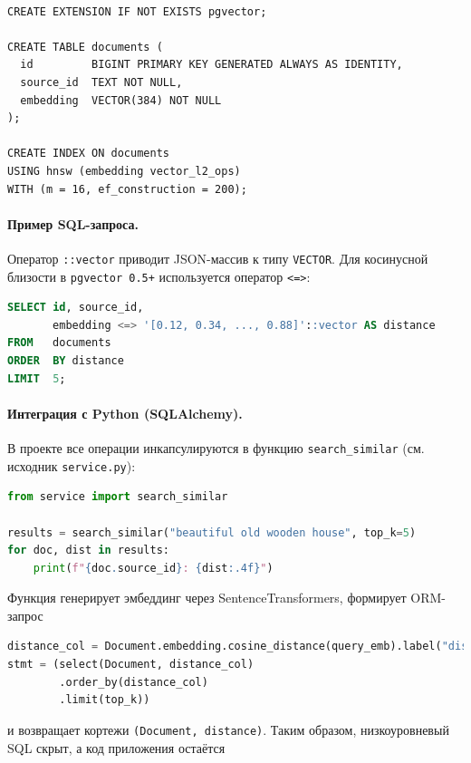 \begin{lstlisting}
      
CREATE EXTENSION IF NOT EXISTS pgvector;

CREATE TABLE documents (
  id         BIGINT PRIMARY KEY GENERATED ALWAYS AS IDENTITY,
  source_id  TEXT NOT NULL,
  embedding  VECTOR(384) NOT NULL
);

CREATE INDEX ON documents
USING hnsw (embedding vector_l2_ops)
WITH (m = 16, ef_construction = 200);
\end{lstlisting}


\paragraph{Пример SQL-запроса.}
Оператор \verb|::vector| приводит JSON-массив к типу \texttt{VECTOR}\@.
Для косинусной близости в \texttt{pgvector 0.5+}
используется оператор \verb|<=>|:

\begin{lstlisting}[language=SQL]
SELECT id, source_id,
       embedding <=> '[0.12, 0.34, ..., 0.88]'::vector AS distance
FROM   documents
ORDER  BY distance                               
LIMIT  5;
\end{lstlisting}

\paragraph{Интеграция с Python (SQLAlchemy).}
В проекте все операции инкапсулируются в функцию
\verb|search_similar| (см. исходник \verb|service.py|):

\begin{lstlisting}[language=Python,encoding=cp1251]
from service import search_similar

results = search_similar("beautiful old wooden house", top_k=5)
for doc, dist in results:
    print(f"{doc.source_id}: {dist:.4f}")
\end{lstlisting}

Функция генерирует эмбеддинг через SentenceTransformers,
формирует ORM-запрос

\begin{lstlisting}[language=Python]
distance_col = Document.embedding.cosine_distance(query_emb).label("distance")
stmt = (select(Document, distance_col)
        .order_by(distance_col)
        .limit(top_k))
\end{lstlisting}

и возвращает кортежи \verb|(Document, distance)|.  
Таким образом, низкоуровневый SQL скрыт,
а код приложения остаётся 
